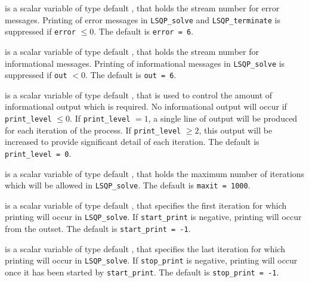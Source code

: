 \documentclass{galahad}
\newcommand{\packagename}{LSQP}
\begin{document}
\begin{description}

 is a scalar variable of type default \integer, that holds the
stream number for error messages. Printing of error messages in 
{\tt \packagename\_solve} and {\tt \packagename\_terminate} is suppressed if 
{\tt error} $\leq 0$.
The default is {\tt error = 6}.

 is a scalar variable of type default \integer, that holds the
stream number for informational messages. Printing of informational messages in 
{\tt \packagename\_solve} is suppressed if {\tt out} $< 0$.
The default is {\tt out = 6}.

 is a scalar variable of type default \integer, that is used
to control the amount of informational output which is required. No 
informational output will occur if {\tt print\_level} $\leq 0$. If 
{\tt print\_level} $= 1$, a single line of output will be produced for each
iteration of the process. If {\tt print\_level} $\geq 2$, this output will be
increased to provide significant detail of each iteration.
The default is {\tt print\_level = 0}.

 is a scalar variable of type default \integer, that holds the
maximum number of iterations which will be allowed in {\tt \packagename\_solve}.
The default is {\tt maxit = 1000}.

 is a scalar variable of type default \integer, that specifies
the first iteration for which printing will occur in {\tt \packagename\_solve}.
If {\tt start\_print} is negative, printing will occur from the outset.
The default is {\tt start\_print = -1}.

 is a scalar variable of type default \integer, that specifies
the last iteration for which printing will occur in  {\tt \packagename\_solve}.
If {\tt stop\_print} is negative, printing will occur once it has been 
started by {\tt start\_print}.
The default is {\tt stop\_print = -1}.




\end{description}
\end{document}
